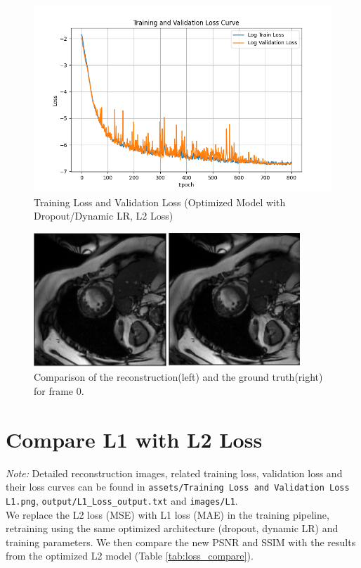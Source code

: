\documentclass{article}
\begin{document}
\begin{figure}[H]
  \centering
  \includegraphics[width=\linewidth]{../assets/Training Loss and Validation Loss.png}
  \caption{Training Loss and Validation Loss (Optimized Model with Dropout/Dynamic LR, L2 Loss)}
  \label{fig:loss_opt}
\end{figure}

\begin{figure}[H]
  \centering
  \includegraphics[width=0.8\linewidth]{../images/compare.PNG}
  \caption{Comparison of the reconstruction(left) and the ground truth(right) for frame 0.}
  \label{fig:compare}
\end{figure}

\section{Compare L1 with L2 Loss}
\textit{Note: }Detailed reconstruction images, related training loss, validation loss and their
loss curves can be found in \texttt{assets/Training Loss and Validation Loss L1.png},
\texttt{output/L1\_Loss\_output.txt} and \texttt{images/L1}.\\
We replace the L2 loss (MSE) with L1 loss (MAE) in the training pipeline, retraining using the same optimized architecture (dropout, dynamic LR) and training parameters. We then compare the new PSNR and SSIM with the results from the optimized L2 model (Table \ref{tab:loss_compare}).
\end{document}
